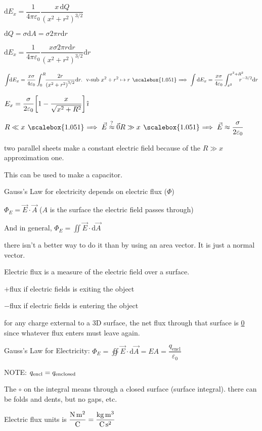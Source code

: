 \documentclass[12pt]{article}
\newcommand \dstyle \displaystyle
\newcommand \hpx [1]{\hspace{#1px}}
\newcommand \nhpx [1]{\hspace{-#1px}}
\newcommand \kvalue {\dfrac 1{4 \pi \varepsilon_0}}
\renewcommand \implies {\hpx 4 \raisebox{-0.14px}{\scalebox{1.051} =} \nhpx{5.2} \Rightarrow \hpx 3}
\newcommand \ihat {\hat{\nhpx 1 \textit\i}}
\newcommand \encl {\mathrm{encl}}
\renewcommand \d {\mathrm d} %
\newcommand \dr {\d r}
\newcommand \dA {\d A}
\newcommand \dE {\d E}
\newcommand \dQ {\d Q}
\begin{document}
$\dE_x = \kvalue \dfrac{x \, \dQ}{\left(x^2 + r^2\right)^{3/2}}$

$\dQ = \sigma \dA = \sigma 2\pi r\dr$

$\dE_x = \kvalue \dfrac{x \sigma 2\pi r\dr}{\left(x^2 + r^2\right)^{3/2}} \dr$

$\dstyle \int \!\! \dE_x = \dfrac{x \sigma}{4 \varepsilon_0} \int_0^R \!\! \dfrac{2r}{\left(x^2 + r^2\right)^{3/2}}\dr.~~\text{v-sub}~x^2 + r^2 \mapsto r \implies \int \dE_x = \dfrac{x \sigma}{4 \varepsilon_0} \int_{x^2}^{x^2 + R^2} \hspace{-10px} r^{-3/2}\dr$

$E_x = \dfrac \sigma{2 \varepsilon_0} \! \left[1 - \dfrac x{\sqrt{x^2 + R^2}}\right] \ihat$

$\hfill R \ll x \implies \vec E \stackrel?\approx \vec 0 \hfill R \gg x \implies \vec E \approx \dfrac \sigma {2 \varepsilon_0} \hfill$

two parallel sheets make a constant electric field because of the $R \gg x$ approximation one.

This can be used to make a capacitor.

Gauss's Law for electricity depends on electric flux ($\Phi$)

$\Phi_E = \vec E \cdot \vec A$ ($A$ is the surface the electric field passes through)

And in  general, $\dstyle \Phi_E = \iint \! \vec E \cdot \d\vec A$

there isn't a better way to do it than by using an area vector. It is just a normal vector.

Electric flux is a measure of the electric field over a surface.

$+$flux if electric fields is exiting the object

$-$flux if electric fields is entering the object

for any charge external to a 3D surface, the net flux through that surface is \underline{0} since whatever flux enters must leave again.

Gauss's Law for Electricity: $\dstyle \Phi_E = \oiint \vec E \cdot \d\vec A = EA = \dfrac{q_\encl}{\varepsilon_0}$

NOTE: $q_\encl = q_{\rm enclosed}$

The $\circ$ on the integral means through a closed surface (surface integral). there can be folds and dents, but no gaps, etc.

Electric flux units is $\dfrac{{\rm N}\,{\rm m}^2}{\rm C} = \dfrac{{\rm kg}\,{\rm m}^3}{{\rm C}\,{\rm s}^2}$
\end{document}
